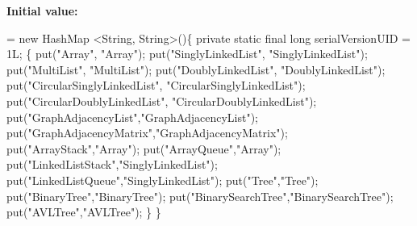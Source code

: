{\bfseries Initial value\+:}
\begin{DoxyCode}
=
            \textcolor{keyword}{new} HashMap <String, String>()\{
                \textcolor{keyword}{private} \textcolor{keyword}{static} \textcolor{keyword}{final} \textcolor{keywordtype}{long} serialVersionUID = 1L;
                \{
                    put(\textcolor{stringliteral}{"Array"}, \textcolor{stringliteral}{"Array"});
                    put(\textcolor{stringliteral}{"SinglyLinkedList"}, \textcolor{stringliteral}{"SinglyLinkedList"});
                    put(\textcolor{stringliteral}{"MultiList"}, \textcolor{stringliteral}{"MultiList"});
                    put(\textcolor{stringliteral}{"DoublyLinkedList"}, \textcolor{stringliteral}{"DoublyLinkedList"});
                    put(\textcolor{stringliteral}{"CircularSinglyLinkedList"}, \textcolor{stringliteral}{"CircularSinglyLinkedList"});
                    put(\textcolor{stringliteral}{"CircularDoublyLinkedList"}, \textcolor{stringliteral}{"CircularDoublyLinkedList"});
                    put(\textcolor{stringliteral}{"GraphAdjacencyList"},\textcolor{stringliteral}{"GraphAdjacencyList"});
                    put(\textcolor{stringliteral}{"GraphAdjacencyMatrix"},\textcolor{stringliteral}{"GraphAdjacencyMatrix"});
                    put(\textcolor{stringliteral}{"ArrayStack"},\textcolor{stringliteral}{"Array"});
                    put(\textcolor{stringliteral}{"ArrayQueue"},\textcolor{stringliteral}{"Array"});
                    put(\textcolor{stringliteral}{"LinkedListStack"},\textcolor{stringliteral}{"SinglyLinkedList"});
                    put(\textcolor{stringliteral}{"LinkedListQueue"},\textcolor{stringliteral}{"SinglyLinkedList"});
                    put(\textcolor{stringliteral}{"Tree"},\textcolor{stringliteral}{"Tree"});
                    put(\textcolor{stringliteral}{"BinaryTree"},\textcolor{stringliteral}{"BinaryTree"});
                    put(\textcolor{stringliteral}{"BinarySearchTree"},\textcolor{stringliteral}{"BinarySearchTree"});
                    put(\textcolor{stringliteral}{"AVLTree"},\textcolor{stringliteral}{"AVLTree"});
                \}
            \}
\end{DoxyCode}
\hypertarget{classbridges_1_1base_1_1_a_d_t_visualizer_a6304c4131e3e7eb5953402368b0e9e3c}{}\label{classbridges_1_1base_1_1_a_d_t_visualizer_a6304c4131e3e7eb5953402368b0e9e3c} 
